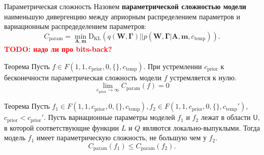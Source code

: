 \documentclass[usenames,dvipsnames,11pt,pdf,utf8,russian,aspectratio=169]{beamer}
\begin{document}
\begin{frame}{Параметрическая сложность}
\footnotesize
Назовем \textbf{параметрической сложностью модели} наименьшую дивергенцию между априорным распределением параметров и вариационным распредеделением параметров:
\[
    C_\text{param} = \min_{\mathbf{A}, \mathbf{m}} \text{D}_\text{KL}(q(\mathbf{W}, \boldsymbol{\Gamma})||p(\mathbf{W}, \boldsymbol{\Gamma}|\mathbf{A}, \mathbf{m}, c_\text{temp})).
\]
\textcolor{red}{\textbf{TODO: надо ли про bits-back?\\}}
\begin{block}{Теорема}
Пусть $f \in F(1, 1, c_{\text{prior}}, 0, \{\},  c_{\text{temp}} )$.
При устремлении $ c_{\text{prior}}$ к бесконечности параметрическая сложность модели $f$ устремляется к нулю.
\[
    \lim_{c_{\text{prior}} \to \infty} C_{\text{param}}(f) = 0
\]
\end{block}

\begin{block}{Теорема}
Пусть $f_1 \in F(1, 1, c_{\text{prior}}, 0, \{\},  c_{\text{temp}} ), f_2 \in F(1, 1, c_{\text{prior}}, 0, \{\},  c_{\text{temp}}' )$, $c_{\text{prior}} < c_{\text{prior}}'$.
Пусть вариационные параметры моделей $f_1$ и $f_2$ лежат в области $\mathsf{U}$, в которой соответствующие функции $L$ и $Q$ являются локально-выпуклыми. 
Тогда модель $f_1$ имеет параметрическую сложность, не большую чем у $f_2$.
\[
    C_\text{param}(f_1) \leq C_\text{param}(f_2).
\]
\end{block}


\end{frame}
\end{document}
